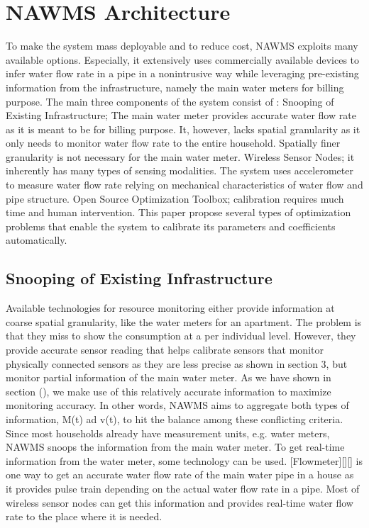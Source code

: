 \section{ NAWMS Architecture}
  \label{sec:architecture}
To make the system mass deployable and to reduce cost, NAWMS exploits many available options. Especially, it extensively uses commercially available devices to infer water flow rate in a pipe in a nonintrusive way while leveraging pre-existing information from the infrastructure, namely the main water meters for billing purpose. 
The main three components of the system consist of : 
 Snooping of Existing Infrastructure; The main water meter provides accurate water flow rate as it is meant to be for billing purpose. It, however, lacks spatial granularity as it only needs to monitor water flow rate to the entire household. Spatially finer granularity is not necessary for the main water meter. 
 Wireless Sensor Nodes; it inherently has many types of sensing modalities. The system uses accelerometer to measure water flow rate relying on mechanical characteristics of water flow and pipe structure.
 Open Source Optimization Toolbox; calibration requires much time and human intervention. This paper propose several types of optimization problems that enable the system to calibrate its parameters and coefficients automatically. 

\subsection{ Snooping of Existing Infrastructure }
  \label{subsec:snooping}
Available technologies for resource monitoring either provide information at coarse spatial granularity, like the water meters for an apartment. The problem is that they miss to show the consumption at a per individual level. 
However, they provide accurate sensor reading that helps calibrate sensors that monitor physically connected sensors as they are less precise as shown in section 3, but monitor partial information of the main water meter. As we have shown in section (), we make use of this relatively accurate information to maximize monitoring accuracy. In other words, NAWMS aims to aggregate both types of information, M(t) ad v(t), to hit the balance among these conflicting criteria. Since most households already have measurement units, e.g. water meters, NAWMS snoops the information from the main water meter.  
To get real-time information from the water meter, some technology can be used. [Flowmeter][][] is one way to get an accurate water flow rate of the main water pipe in a house as it provides pulse train depending on the actual water flow rate in a pipe. Most of wireless sensor nodes can get this information and provides real-time water flow rate to the place where it is needed. 

